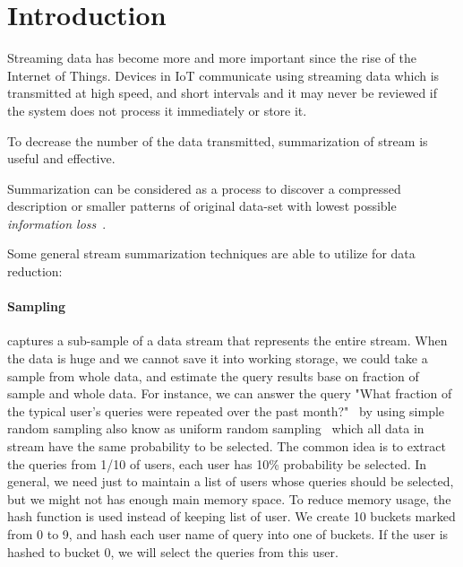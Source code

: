 \section{Introduction}

Streaming data has become more and more important since the rise of the Internet
of Things. Devices in IoT communicate using streaming data which is transmitted
at high speed, and short intervals and it may never be reviewed if the system
does not process it immediately or store it. 


To decrease the number of the data transmitted, summarization of stream is
useful and effective.  

Summarization can be considered as a process to discover a compressed
description or smaller patterns of original data-set with lowest possible
\emph{information loss}~\cite{chandola2007summarization}. 

Some general stream summarization techniques are able to utilize for data
reduction:
\paragraph{Sampling} captures a sub-sample of a data stream that represents the
entire stream. When the data is huge and we cannot save it into working storage,
we could take a sample from whole data, and estimate the query results base on
fraction of sample and whole data.  For instance, we can answer the query "What
fraction of the typical user's queries were repeated over the past month?"~\cite{leskovec2014mining} by
using simple random sampling also know as uniform random
sampling~\cite{vitter1984faster, Ahrens1985SequentialRS} which all data in
stream have the same probability to be selected. The common idea is to extract
the queries from 1/10 of users, each user has 10\% probability be selected. In
general, we need just to maintain a list of users whose queries should be
selected, but we might not has enough main memory space. To reduce memory usage,
the hash function is used instead of keeping list of user. We create 10 buckets
marked from 0 to 9, and hash each user name of query into one of buckets. If the
user is hashed to bucket 0, we will select the queries from this user.

